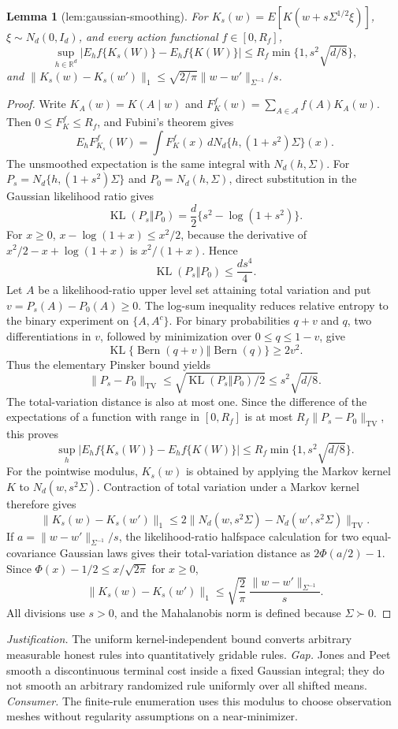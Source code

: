 \documentclass{article}
\newtheorem{lemma}{Lemma}
\begin{document}
\begin{lemma}[lem:gaussian-smoothing]\label{lem:gaussian-smoothing}
For \(K_s(w)=E[K(w+s\Sigma^{1/2}\xi)]\), \(\xi\sim N_d(0,I_d)\), and every action functional \(f\in[0,R_f]\), \[\sup_{h\in\mathbb R^d}|E_hf\{K_s(W)\}-E_hf\{K(W)\}|\le R_f\min\{1,s^2\sqrt{d/8}\},\] and \(\|K_s(w)-K_s(w')\|_1\le\sqrt{2/\pi}\|w-w'\|_{\Sigma^{-1}}/s\).
\end{lemma}
\begin{proof}
Write \(K_A(w)=K(A\mid w)\) and \(F_K^f(w)=\sum_{A\in\mathcal A}f(A)K_A(w)\). Then \(0\le F_K^f\le R_f\), and Fubini's theorem gives
\[
 E_hF_{K_s}^f(W)
 =\int F_K^f(x)\,dN_d\{h,(1+s^2)\Sigma\}(x).
\]
The unsmoothed expectation is the same integral with \(N_d(h,\Sigma)\). For \(P_s=N_d\{h,(1+s^2)\Sigma\}\) and \(P_0=N_d(h,\Sigma)\), direct substitution in the Gaussian likelihood ratio gives
\[
 \operatorname{KL}(P_s\Vert P_0)
 =\frac d2\{s^2-\log(1+s^2)\}.
\]
For \(x\ge0\), \(x-\log(1+x)\le x^2/2\), because the derivative of \(x^2/2-x+\log(1+x)\) is \(x^2/(1+x)\). Hence
\[
 \operatorname{KL}(P_s\Vert P_0)\le \frac{ds^4}{4}.
\]
Let \(A\) be a likelihood-ratio upper level set attaining total variation and put \(v=P_s(A)-P_0(A)\ge0\). The log-sum inequality reduces relative entropy to the binary experiment on \(\{A,A^c\}\). For binary probabilities \(q+v\) and \(q\), two differentiations in \(v\), followed by minimization over \(0\le q\le1-v\), give
\[
 \operatorname{KL}\{\operatorname{Bern}(q+v)\Vert\operatorname{Bern}(q)\}\ge2v^2.
\]
Thus the elementary Pinsker bound yields
\[
 \|P_s-P_0\|_{\mathrm{TV}}
 \le \sqrt{\operatorname{KL}(P_s\Vert P_0)/2}
 \le s^2\sqrt{d/8}.
\]
The total-variation distance is also at most one. Since the difference of the expectations of a function with range in \([0,R_f]\) is at most \(R_f\|P_s-P_0\|_{\mathrm{TV}}\), this proves
\[
 \sup_h\left|E_hf\{K_s(W)\}-E_hf\{K(W)\}\right|
 \le R_f\min\{1,s^2\sqrt{d/8}\}.
\]
For the pointwise modulus, \(K_s(w)\) is obtained by applying the Markov kernel \(K\) to \(N_d(w,s^2\Sigma)\). Contraction of total variation under a Markov kernel therefore gives
\[
 \|K_s(w)-K_s(w')\|_1
 \le 2\|N_d(w,s^2\Sigma)-N_d(w',s^2\Sigma)\|_{\mathrm{TV}}.
\]
If \(a=\|w-w'\|_{\Sigma^{-1}}/s\), the likelihood-ratio halfspace calculation for two equal-covariance Gaussian laws gives their total-variation distance as \(2\Phi(a/2)-1\). Since \(\Phi(x)-1/2\le x/\sqrt{2\pi}\) for \(x\ge0\),
\[
 \|K_s(w)-K_s(w')\|_1
 \le \sqrt{\frac2\pi}\,\frac{\|w-w'\|_{\Sigma^{-1}}}{s}.
\]
All divisions use \(s>0\), and the Mahalanobis norm is defined because \(\Sigma\succ0\).
\end{proof}
\par\smallskip\noindent \textit{Justification.} The uniform kernel-independent bound converts arbitrary measurable honest rules into quantitatively gridable rules. \textit{Gap.} Jones and Peet smooth a discontinuous terminal cost inside a fixed Gaussian integral; they do not smooth an arbitrary randomized rule uniformly over all shifted means. \textit{Consumer.} The finite-rule enumeration uses this modulus to choose observation meshes without regularity assumptions on a near-minimizer.
\end{document}
